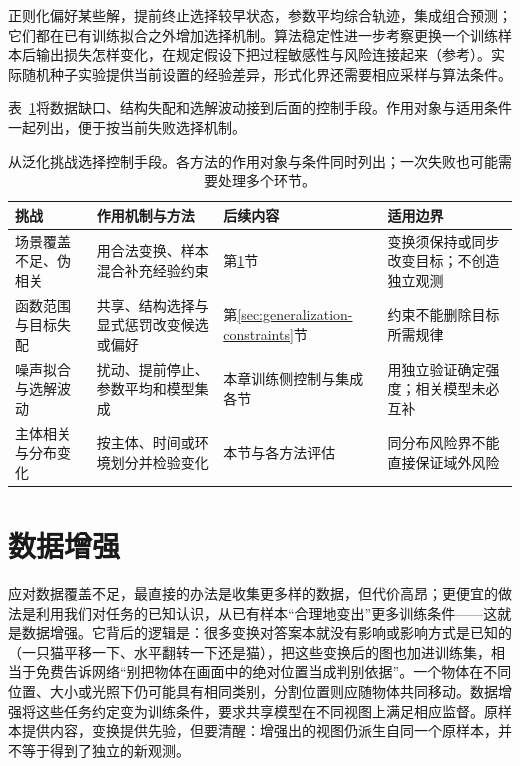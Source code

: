 正则化偏好某些解，提前终止选择较早状态，参数平均综合轨迹，集成组合预测；它们都在已有训练拟合之外增加选择机制。算法稳定性进一步考察更换一个训练样本后输出损失怎样变化，在规定假设下把过程敏感性与风险连接起来（参考）。实际随机种子实验提供当前设置的经验差异，形式化界还需要相应采样与算法条件。

表~\ref{tab:generalization-challenge-remedies}将数据缺口、结构失配和选解波动接到后面的控制手段。作用对象与适用条件一起列出，便于按当前失败选择机制。
\begin{table}[htbp]
\centering\small
\begin{tabular}{@{}p{32mm}p{48mm}p{27mm}p{48mm}@{}}
\toprule
挑战 & 作用机制与方法 & 后续内容 & 适用边界\\
\midrule
场景覆盖不足、伪相关 & 用合法变换、样本混合补充经验约束 & 第\ref{sec:generalization-augmentation}节 & 变换须保持或同步改变目标；不创造独立观测\\
函数范围与目标失配 & 共享、结构选择与显式惩罚改变候选或偏好 & 第\ref{sec:generalization-constraints}节 & 约束不能删除目标所需规律\\
噪声拟合与选解波动 & 扰动、提前停止、参数平均和模型集成 & 本章训练侧控制与集成各节 & 用独立验证确定强度；相关模型未必互补\\
主体相关与分布变化 & 按主体、时间或环境划分并检验变化 & 本节与各方法评估 & 同分布风险界不能直接保证域外风险\\
\bottomrule
\end{tabular}
\caption{从泛化挑战选择控制手段。各方法的作用对象与条件同时列出；一次失败也可能需要处理多个环节。}
\label{tab:generalization-challenge-remedies}
\end{table}

\section{数据增强}
\label{sec:generalization-augmentation}

应对数据覆盖不足，最直接的办法是收集更多样的数据，但代价高昂；更便宜的做法是利用我们对任务的已知认识，从已有样本“合理地变出”更多训练条件——这就是数据增强。它背后的逻辑是：很多变换对答案本就没有影响或影响方式是已知的（一只猫平移一下、水平翻转一下还是猫），把这些变换后的图也加进训练集，相当于免费告诉网络“别把物体在画面中的绝对位置当成判别依据”。一个物体在不同位置、大小或光照下仍可能具有相同类别，分割位置则应随物体共同移动。数据增强将这些任务约定变为训练条件，要求共享模型在不同视图上满足相应监督。原样本提供内容，变换提供先验，但要清醒：增强出的视图仍派生自同一个原样本，并不等于得到了独立的新观测。

